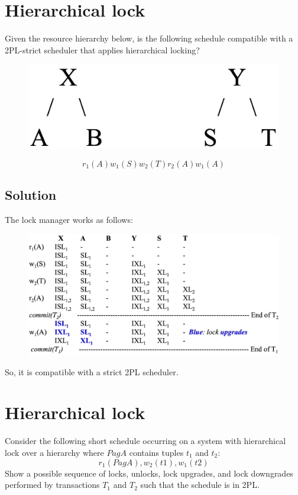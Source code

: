 \documentclass[12pt, a4paper]{report}
\newtheorem[style=M,bodystyle=\normalfont]{theorem}{Theorem}
\newtheorem[style=M,bodystyle=\normalfont]{corollary}{Corollary}
\newtheorem[style=M,bodystyle=\normalfont]{lemma}{Lemma}
\newtheorem[style=M,bodystyle=\normalfont]{definition}{Definition}
\begin{document}
    \section{Hierarchical lock}
        Given the resource hierarchy below, is the following schedule compatible with a 2PL-strict scheduler that applies hierarchical locking?
        \begin{figure}[H]
            \centering
            \includegraphics[width=0.25\linewidth]{images/HL1.png}
        \end{figure}
        \[r_1(A) w_1(S) w_2(T) r_2(A) w_1(A)\]
    \subsection*{Solution}
        The lock manager works as follows: 
        \begin{figure}[H]
            \centering
            \includegraphics[width=1\linewidth]{images/HLsol.png}
        \end{figure}
        So, it is compatible with a strict 2PL scheduler. 

    \newpage

    \section{Hierarchical lock}
        Consider the following short schedule occurring on a system with hierarchical lock over a hierarchy where $PagA$ contains tuples 
        $t_1$ and $t_2$:
        \[r_1( PagA ), w_2( t1 ), w_1( t2 )\]
        Show a possible sequence of locks, unlocks, lock upgrades, and lock downgrades performed by transactions $T_1$ and $T_2$ such that
        the schedule is in 2PL.
\end{document}
